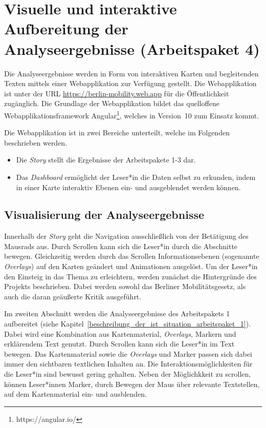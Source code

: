 \newpage

\section{Visuelle und interaktive Aufbereitung der Analyseergebnisse (Arbeitspaket 4)}
\label{ergebnispraesentation}

Die Analyseergebnisse werden in Form von interaktiven Karten und begleitenden Texten mittels einer Webapplikation zur Verfügung gestellt. Die Webapplikation ist unter der URL \url{https://berlin-mobility.web.app} für die Öffentlichkeit zugänglich. Die Grundlage der Webapplikation bildet das quelloffene Webapplikationsframework Angular\footnote{https://angular.io/}, welches in Version~10 zum Einsatz kommt.


Die Webapplikation ist in zwei Bereiche unterteilt, welche im Folgenden beschrieben werden.

\begin{itemize}
    \item Die \emph{Story} stellt die Ergebnisse der Arbeitspakete 1-3 dar.
    \item Das \emph{Dashboard} ermöglicht der Leser*in die Daten selbst zu erkunden, indem in einer Karte interaktiv Ebenen ein- und ausgeblendet werden können.
\end{itemize}

\subsection{Visualisierung der Analyseergebnisse}
\label{visualisierung_der_analyseergebnisse}

Innerhalb der \emph{Story} geht die Navigation ausschließlich von der Betätigung des Mausrads aus. Durch Scrollen kann sich die Leser*in durch die Abschnitte bewegen. Gleichzeitig werden durch das Scrollen Informationsebenen (sogenannte \emph{Overlays}) auf den Karten geändert und Animationen ausgelöst. Um der Leser*in den Einsteig in das Thema zu erleichtern, werden zunächst die Hintergründe des Projekts beschrieben. Dabei werden sowohl das Berliner Mobilitätsgesetz, als auch die daran geäußerte Kritik ausgeführt.

Im zweiten Abschnitt werden die Analyseergebnisse des Arbeitspakets 1 aufbereitet (siehe Kapitel~\ref{beschreibung_der_ist_situation_arbeitspaket_1}). Dabei wird eine Kombination aus Kartenmaterial, \emph{Overlays}, Markern und erklärendem Text genutzt. Durch Scrollen kann sich die Leser*in im Text bewegen. Das Kartenmaterial sowie die \emph{Overlays} und Marker passen sich dabei immer den sichtbaren textlichen Inhalten an. Die Interaktionsmöglichkeiten für die Leser*in sind bewusst gering gehalten. Neben der Möglichkkeit zu scrollen, können Leser*innen Marker, durch Bewegen der Maus über relevante Textstellen, auf dem Kartenmaterial ein- und ausblenden.

